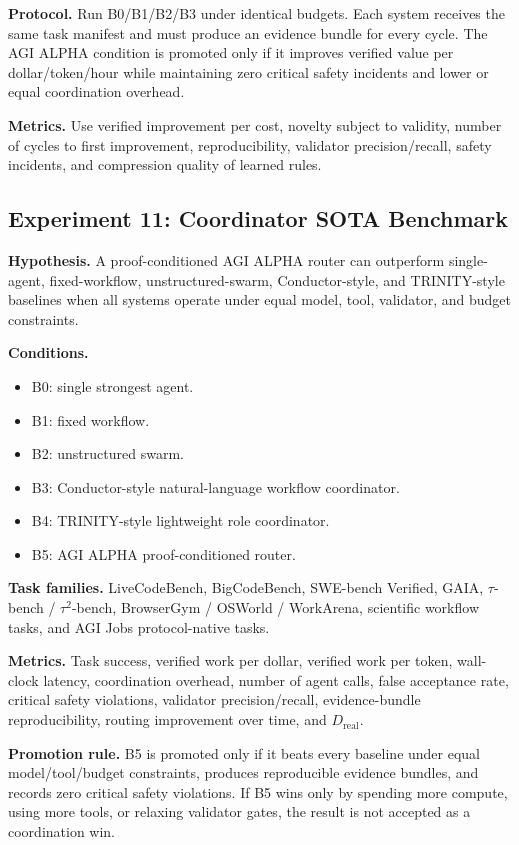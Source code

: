 \documentclass[11pt]{article}
\providecommand{\tightlist}{\setlength{\itemsep}{0pt}\setlength{\parskip}{0pt}}
\begin{document}
\textbf{Protocol.} Run B0/B1/B2/B3 under identical budgets. Each system
receives the same task manifest and must produce an evidence bundle for
every cycle. The AGI ALPHA condition is promoted only if it improves
verified value per dollar/token/hour while maintaining zero critical
safety incidents and lower or equal coordination overhead.

\textbf{Metrics.} Use verified improvement per cost, novelty subject to
validity, number of cycles to first improvement, reproducibility,
validator precision/recall, safety incidents, and compression quality of
learned rules.

\subsection{Experiment 11: Coordinator SOTA
Benchmark}\label{experiment-11-coordinator-sota-benchmark}

\textbf{Hypothesis.} A proof-conditioned AGI ALPHA router can outperform
single-agent, fixed-workflow, unstructured-swarm, Conductor-style, and
TRINITY-style baselines when all systems operate under equal model,
tool, validator, and budget constraints.

\textbf{Conditions.}

\begin{itemize}
\tightlist
\item
  B0: single strongest agent.
\item
  B1: fixed workflow.
\item
  B2: unstructured swarm.
\item
  B3: Conductor-style natural-language workflow coordinator.
\item
  B4: TRINITY-style lightweight role coordinator.
\item
  B5: AGI ALPHA proof-conditioned router.
\end{itemize}

\textbf{Task families.} LiveCodeBench, BigCodeBench, SWE-bench Verified,
GAIA, \(\tau\)-bench / \(\tau^2\)-bench, BrowserGym / OSWorld /
WorkArena, scientific workflow tasks, and AGI Jobs protocol-native
tasks.

\textbf{Metrics.} Task success, verified work per dollar, verified work
per token, wall-clock latency, coordination overhead, number of agent
calls, false acceptance rate, critical safety violations, validator
precision/recall, evidence-bundle reproducibility, routing improvement
over time, and \(D_{\mathrm{real}}\).

\textbf{Promotion rule.} B5 is promoted only if it beats every baseline
under equal model/tool/budget constraints, produces reproducible
evidence bundles, and records zero critical safety violations. If B5
wins only by spending more compute, using more tools, or relaxing
validator gates, the result is not accepted as a coordination win.
\end{document}
